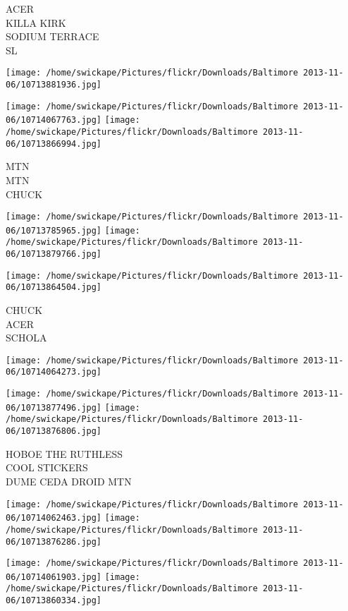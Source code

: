 \documentclass[10pt,letterpaper]{article}
\begin{document}
ACER\\
KILLA KIRK\\
SODIUM TERRACE\\
SL
\pagebreak

\texttt{[image: /home/swickape/Pictures/flickr/Downloads/Baltimore 2013-11-06/10713881936.jpg]}

\vspace{0.25in}
\texttt{[image: /home/swickape/Pictures/flickr/Downloads/Baltimore 2013-11-06/10714067763.jpg]}
\texttt{[image: /home/swickape/Pictures/flickr/Downloads/Baltimore 2013-11-06/10713866994.jpg]}

MTN\\
MTN\\
CHUCK
\pagebreak

\texttt{[image: /home/swickape/Pictures/flickr/Downloads/Baltimore 2013-11-06/10713785965.jpg]}
\texttt{[image: /home/swickape/Pictures/flickr/Downloads/Baltimore 2013-11-06/10713879766.jpg]}

\texttt{[image: /home/swickape/Pictures/flickr/Downloads/Baltimore 2013-11-06/10713864504.jpg]}

CHUCK\\
ACER\\
SCHOLA
\pagebreak

\texttt{[image: /home/swickape/Pictures/flickr/Downloads/Baltimore 2013-11-06/10714064273.jpg]}

\vspace{0.25in}
\texttt{[image: /home/swickape/Pictures/flickr/Downloads/Baltimore 2013-11-06/10713877496.jpg]}
\texttt{[image: /home/swickape/Pictures/flickr/Downloads/Baltimore 2013-11-06/10713876806.jpg]}

HOBOE THE RUTHLESS\\
COOL STICKERS\\
DUME CEDA DROID MTN
\pagebreak

\texttt{[image: /home/swickape/Pictures/flickr/Downloads/Baltimore 2013-11-06/10714062463.jpg]}
\texttt{[image: /home/swickape/Pictures/flickr/Downloads/Baltimore 2013-11-06/10713876286.jpg]}

\texttt{[image: /home/swickape/Pictures/flickr/Downloads/Baltimore 2013-11-06/10714061903.jpg]}
\texttt{[image: /home/swickape/Pictures/flickr/Downloads/Baltimore 2013-11-06/10713860334.jpg]}
\end{document}

